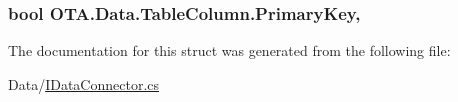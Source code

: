 \subsubsection[{Primary\+Key}]{\setlength{\rightskip}{0pt plus 5cm}bool O\+T\+A.\+Data.\+Table\+Column.\+Primary\+Key\hspace{0.3cm}{\ttfamily [get]}, {\ttfamily [set]}}\label{struct_o_t_a_1_1_data_1_1_table_column_a3c34ef10d53f12f9d52b5d06686063fc}


The documentation for this struct was generated from the following file\+:\begin{DoxyCompactItemize}
\item 
Data/\hyperlink{_i_data_connector_8cs}{I\+Data\+Connector.\+cs}\end{DoxyCompactItemize}
